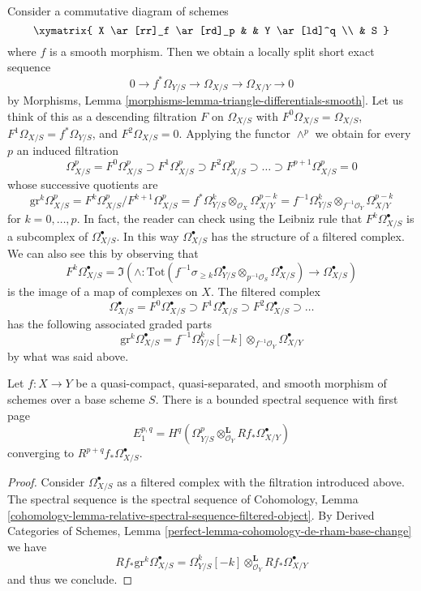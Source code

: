 \noindent
Consider a commutative diagram of schemes
$$
\xymatrix{
X \ar[rr]_f \ar[rd]_p & & Y \ar[ld]^q \\
& S
}
$$
where $f$ is a smooth morphism. Then we obtain a locally split short
exact sequence
$$
0 \to f^*\Omega_{Y/S} \to \Omega_{X/S} \to \Omega_{X/Y} \to 0
$$
by Morphisms, Lemma \ref{morphisms-lemma-triangle-differentials-smooth}.
Let us think of this as a descending filtration $F$ on $\Omega_{X/S}$
with $F^0\Omega_{X/S} = \Omega_{X/S}$, $F^1\Omega_{X/S} = f^*\Omega_{Y/S}$, and
$F^2\Omega_{X/S} = 0$. Applying the functor $\wedge^p$ we obtain
for every $p$ an induced filtration
$$
\Omega^p_{X/S} = F^0\Omega^p_{X/S} \supset
F^1\Omega^p_{X/S} \supset
F^2\Omega^p_{X/S} \supset \ldots \supset F^{p + 1}\Omega^p_{X/S} = 0
$$
whose successive quotients are
$$
\text{gr}^k\Omega^p_{X/S} =
F^k\Omega^p_{X/S}/F^{k + 1}\Omega^p_{X/S} =
f^*\Omega^k_{Y/S} \otimes_{\mathcal{O}_X} \Omega^{p - k}_{X/Y} =
f^{-1}\Omega^k_{Y/S} \otimes_{f^{-1}\mathcal{O}_Y} \Omega^{p - k}_{X/Y}
$$
for $k = 0, \ldots, p$. In fact, the reader can check using the
Leibniz rule that $F^k\Omega^\bullet_{X/S}$ is a subcomplex of
$\Omega^\bullet_{X/S}$. In this way $\Omega^\bullet_{X/S}$ has
the structure of a filtered complex. We can also see this by observing
that
$$
F^k\Omega^\bullet_{X/S} =
\Im\left(\wedge :
\text{Tot}(
f^{-1}\sigma_{\geq k}\Omega^\bullet_{Y/S} \otimes_{p^{-1}\mathcal{O}_S}
\Omega^\bullet_{X/S})
\longrightarrow
\Omega^\bullet_{X/S}\right)
$$
is the image of a map of complexes on $X$. The filtered complex
$$
\Omega^\bullet_{X/S} = F^0\Omega^\bullet_{X/S} \supset
F^1\Omega^\bullet_{X/S} \supset F^2\Omega^\bullet_{X/S} \supset \ldots
$$
has the following associated graded parts
$$
\text{gr}^k\Omega^\bullet_{X/S} = 
f^{-1}\Omega^k_{Y/S}[-k] \otimes_{f^{-1}\mathcal{O}_Y} \Omega^\bullet_{X/Y}
$$
by what was said above.

\begin{lemma}
\label{lemma-spectral-sequence-smooth}
Let $f : X \to Y$ be a quasi-compact, quasi-separated, and smooth
morphism of schemes over a base scheme $S$. There is a bounded spectral
sequence with first page
$$
E_1^{p, q} =
H^q(\Omega^p_{Y/S} \otimes_{\mathcal{O}_Y}^\mathbf{L} Rf_*\Omega^\bullet_{X/Y})
$$
converging to $R^{p + q}f_*\Omega^\bullet_{X/S}$.
\end{lemma}

\begin{proof}
Consider $\Omega^\bullet_{X/S}$ as a filtered complex with the
filtration introduced above. The spectral sequence is the
spectral sequence of Cohomology, Lemma
\ref{cohomology-lemma-relative-spectral-sequence-filtered-object}.
By Derived Categories of Schemes, Lemma
\ref{perfect-lemma-cohomology-de-rham-base-change} we have
$$
Rf_*\text{gr}^k\Omega^\bullet_{X/S} =
\Omega^k_{Y/S}[-k] \otimes_{\mathcal{O}_Y}^\mathbf{L} Rf_*\Omega^\bullet_{X/Y}
$$
and thus we conclude.
\end{proof}

